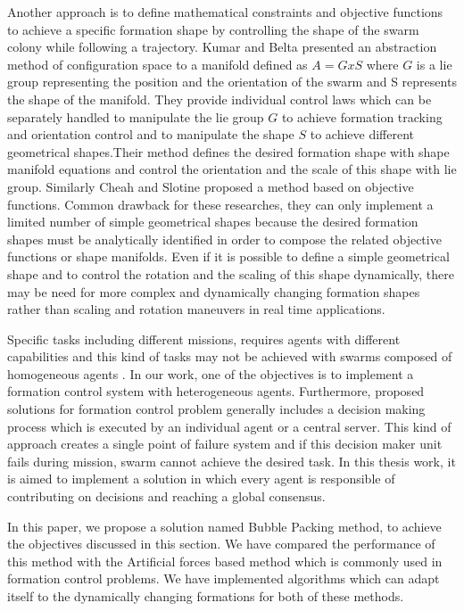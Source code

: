 \documentclass[letterpaper, 10 pt, conference]{ieeeconf}  %
\begin{document}
Another approach is to define mathematical constraints and objective functions to achieve a specific formation shape by controlling the shape of the swarm colony while following a trajectory.  Kumar and Belta \cite{25} presented an abstraction method of configuration space to a manifold defined as $A  = G x S$ where $G$ is a lie group representing the position and the orientation of the swarm  and S represents the shape of the manifold.  They provide individual control laws which can be separately handled to manipulate the lie group $G$ to achieve formation tracking and orientation control and to manipulate the shape $S$ to achieve different geometrical shapes.Their method defines the desired formation shape with shape manifold equations and control the orientation and the scale of this shape with lie group. Similarly Cheah and Slotine \cite{8} proposed a method based on objective functions. Common drawback for these researches, they can only implement a limited number of simple geometrical shapes because the desired formation shapes must be analytically identified in order to compose the related objective functions or shape manifolds. Even if it is possible to define a simple geometrical shape and to control the rotation and the scaling of this shape dynamically, there may be need for more complex and dynamically changing formation shapes rather than scaling and rotation maneuvers in real time applications. 


Specific tasks including different missions, requires agents with different capabilities and this kind of tasks may not be achieved with swarms composed of homogeneous agents \cite{99}. In our work, one of the objectives is to implement a formation control system with heterogeneous agents. Furthermore, proposed solutions for formation control problem generally includes a decision making process which is executed by an individual agent or a central server. This kind of approach creates a single point of failure system and if this decision maker unit fails during mission, swarm cannot achieve the desired task. In this thesis work, it is aimed to implement a solution in which every agent is responsible of contributing on decisions and reaching a global consensus. 


In this paper, we propose a solution named Bubble Packing method, to achieve the objectives discussed in this section. We have compared the performance of this method with the Artificial forces based method which is commonly used in formation control problems. We have implemented algorithms which can adapt itself to the dynamically changing formations for both of these methods.
\end{document}

